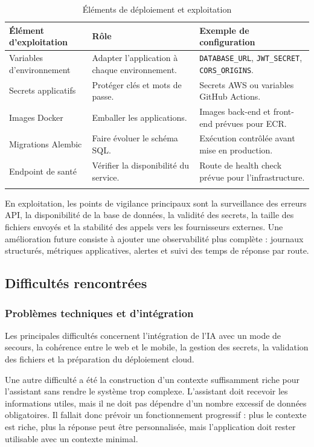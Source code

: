 \documentclass{rapportENSET}
\begin{document}
\begin{longtable}{@{}L{0.27\textwidth}L{0.33\textwidth}L{0.30\textwidth}@{}}
\toprule
\textbf{Élément d'exploitation} & \textbf{Rôle} & \textbf{Exemple de configuration} \\
\midrule
\endhead
Variables d'environnement & Adapter l'application à chaque environnement. & \texttt{DATABASE\_URL}, \texttt{JWT\_SECRET}, \texttt{CORS\_ORIGINS}. \\
Secrets applicatifs & Protéger clés et mots de passe. & Secrets AWS ou variables GitHub Actions. \\
Images Docker & Emballer les applications. & Images back-end et front-end prévues pour ECR. \\
Migrations Alembic & Faire évoluer le schéma SQL. & Exécution contrôlée avant mise en production. \\
Endpoint de santé & Vérifier la disponibilité du service. & Route de health check prévue pour l'infrastructure. \\
\bottomrule
\caption{Éléments de déploiement et exploitation}
\end{longtable}

En exploitation, les points de vigilance principaux sont la surveillance des erreurs API, la disponibilité de la base de données, la validité des secrets, la taille des fichiers envoyés et la stabilité des appels vers les fournisseurs externes. Une amélioration future consiste à ajouter une observabilité plus complète : journaux structurés, métriques applicatives, alertes et suivi des temps de réponse par route.

\subsection{Difficultés rencontrées}
\subsubsection*{Problèmes techniques et d'intégration}
Les principales difficultés concernent l'intégration de l'IA avec un mode de secours, la cohérence entre le web et le mobile, la gestion des secrets, la validation des fichiers et la préparation du déploiement cloud.

Une autre difficulté a été la construction d'un contexte suffisamment riche pour l'assistant sans rendre le système trop complexe. L'assistant doit recevoir les informations utiles, mais il ne doit pas dépendre d'un nombre excessif de données obligatoires. Il fallait donc prévoir un fonctionnement progressif : plus le contexte est riche, plus la réponse peut être personnalisée, mais l'application doit rester utilisable avec un contexte minimal.
\end{document}
